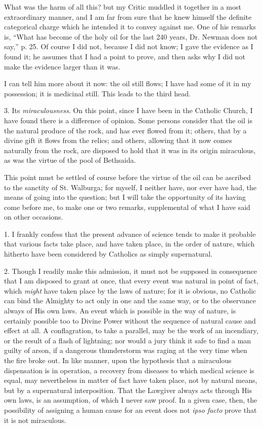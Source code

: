What was the harm of all this? but my Critic muddled it
together in a most extraordinary manner, and I am far from sure that he
knew himself the
definite categorical charge which he intended it to convey against me. One of his remarks is, ``What has
become of the holy oil for the last 240 years, Dr. Newman does not
say,'' p. 25. Of course I did not, because I did not know; I gave
the evidence as I found it; he assumes that I had a point to prove, and
then asks why I did not make the evidence larger than it was.

I can tell him more about it now: the oil still flows; I have had
some of it in my possession; it is medicinal still. This leads to the third head.

3. Its \emph{miraculousness}.
On this point, since I have been in the Catholic Church, I have found
there is a difference of opinion. Some persons consider that the oil is
the natural produce of the rock, and has ever flowed from it; others,
that by a divine gift it flows from the relics; and others, allowing
that it now comes naturally from the rock, are disposed to hold that it
was in its origin miraculous, as was the virtue of the pool of Bethsaida.

This point must be settled of course before the virtue of the oil can
be ascribed to the sanctity of St. Walburga; for myself, I neither have,
nor ever have had, the means of going into the question; but I will take
the opportunity of its having come before me, to make one or two
remarks, supplemental of what I have said on other occasions.

1. I frankly confess that the present advance of science tends to
make it probable that various facts take place, and have taken place, in
the order of nature, which hitherto have been considered by Catholics as
simply supernatural.

2. Though I readily make this admission, it must not be
supposed in consequence that I am disposed to grant at once, that every
event was natural in point of fact, which \emph{might} have taken place
by the laws of nature; for it is obvious, no Catholic can bind the
Almighty to act only in one and the same way, or to the observance
always of His own laws. An event which is possible in the way of nature,
is certainly possible too to Divine Power without the sequence of
natural cause and effect at all. A conflagration, to take a parallel,
may be the work of an incendiary, or the result of a flash of lightning;
nor would a jury think it safe to find a man guilty of arson, if a
dangerous thunderstorm was raging at the very time when the fire broke
out. In like manner, upon the hypothesis that a miraculous dispensation
is in operation, a recovery from diseases to which medical science is
equal, may nevertheless in matter of fact have taken place, not by
natural means, but by a supernatural interposition. That the Lawgiver
always acts through His own laws, is an assumption, of which I never saw
proof. In a given case, then, the possibility of assigning a human cause
for an event does not \emph{ipso facto} prove that it is not miraculous.

